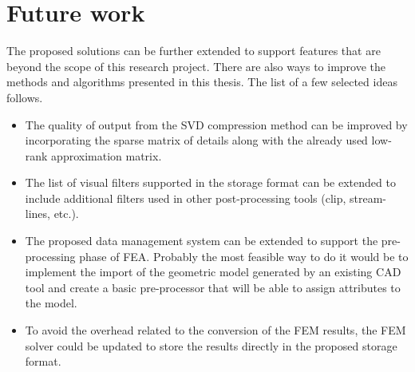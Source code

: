 
\section{Future work}

The proposed solutions can be further extended to support features that are beyond the scope of this research project. There are also ways to improve the methods and algorithms presented in this thesis. The list of a few selected ideas follows.

\begin{itemize}
    \item The quality of output from the SVD compression method can be improved by incorporating the sparse matrix of details \cite{Candes2011} along with the already used low-rank approximation matrix.
    \item The list of visual filters supported in the storage format can be extended to include additional filters used in other post-processing tools (clip, stream-lines, etc.).
    \item The proposed data management system can be extended to support the pre-processing phase of FEA. Probably the most feasible way to do it would be to implement the import of the geometric model generated by an existing CAD tool and create a basic pre-processor that will be able to assign attributes to the model.
    \item To avoid the overhead related to the conversion of the FEM results, the FEM solver could be updated to store the results directly in the proposed storage format.
\end{itemize}
